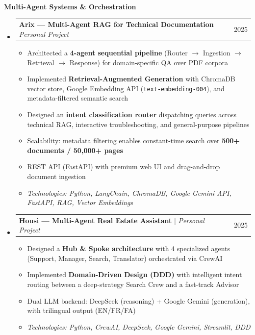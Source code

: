 \documentclass[11pt,a4paper]{article}
\makeatletter
\newcommand{\subspace}{\vspace{0.5em}}
\newcommand{\cvsubsection}[1]{
    \subspace
    \noindent\textcolor{primary}{\large \textbf{#1}}
    \par\vspace{0.3em}
}
\newcommand{\headerrow}[2]{
    \begin{tabular*}{\linewidth}{l@{\extracolsep{\fill}}r}
    #1 & \textcolor{primary}{#2} \\
    \end{tabular*}
}
\makeatother
\begin{document}
\cvsubsection{Multi-Agent Systems \& Orchestration}
\begin{itemize}[leftmargin=1em, label={}]
    \item
    \headerrow{\textbf{Arix — Multi-Agent RAG for Technical Documentation} | \emph{Personal Project}}{2025}
    \begin{itemize}[leftmargin=1.5em, label=$\bullet$, nosep]
        \item Architected a \textbf{4-agent sequential pipeline} (Router $\rightarrow$ Ingestion $\rightarrow$ Retrieval $\rightarrow$ Response) for domain-specific QA over PDF corpora
        \item Implemented \textbf{Retrieval-Augmented Generation} with ChromaDB vector store, Google Embedding API (\texttt{text-embedding-004}), and metadata-filtered semantic search
        \item Designed an \textbf{intent classification router} dispatching queries across technical RAG, interactive troubleshooting, and general-purpose pipelines
        \item Scalability: metadata filtering enables constant-time search over \textbf{500+ documents / 50,000+ pages}
        \item REST API (FastAPI) with premium web UI and drag-and-drop document ingestion
        \item \emph{Technologies: Python, LangChain, ChromaDB, Google Gemini API, FastAPI, RAG, Vector Embeddings}
    \end{itemize}

    \subspace 
    \item
    \headerrow{\textbf{Housi — Multi-Agent Real Estate Assistant} | \emph{Personal Project}}{2025}
    \begin{itemize}[leftmargin=1.5em, label=$\bullet$, nosep]
        \item Designed a \textbf{Hub \& Spoke architecture} with 4 specialized agents (Support, Manager, Search, Translator) orchestrated via CrewAI
        \item Implemented \textbf{Domain-Driven Design (DDD)} with intelligent intent routing between a deep-strategy Search Crew and a fast-track Advisor
        \item Dual LLM backend: DeepSeek (reasoning) + Google Gemini (generation), with trilingual output (EN/FR/FA)
        \item \emph{Technologies: Python, CrewAI, DeepSeek, Google Gemini, Streamlit, DDD}
    \end{itemize}


\end{itemize}
\end{document}
